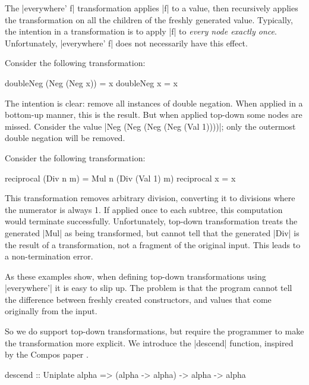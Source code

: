 The |everywhere' f| transformation applies |f| to a value, then recursively applies the transformation on all the children of the freshly generated value. Typically, the intention in a transformation is to apply |f| to \textit{every node exactly once}. Unfortunately, |everywhere' f| does not necessarily have this effect.

\begin{example}
Consider the following transformation:

\begin{code}
doubleNeg (Neg (Neg x))  = x
doubleNeg x              = x
\end{code}

The intention is clear: remove all instances of double negation. When applied in a bottom-up manner, this is the result. But when applied top-down some nodes are missed. Consider the value |Neg (Neg (Neg (Neg (Val 1))))|; only the outermost double negation will be removed.
\end{example}

\begin{example}
Consider the following transformation:

\begin{code}
reciprocal (Div n m)  = Mul n (Div (Val 1) m)
reciprocal x          = x
\end{code}

This transformation removes arbitrary division, converting it to divisions where the numerator is always 1. If applied once to each subtree, this computation would terminate successfully. Unfortunately, top-down transformation treats the generated |Mul| as  being transformed, but cannot tell that the generated |Div| is the result of a transformation, not a fragment of the original input. This leads to a non-termination error.
\end{example}

As these examples show, when defining top-down transformations using |everywhere'| it is easy to slip up. The problem is that the program cannot tell the difference between freshly created constructors, and values that come originally from the input.

So we do support top-down transformations, but require the programmer to make the transformation more explicit. We introduce the |descend| function, inspired by the Compos paper \cite{bringert:compos}.

\begin{code}
descend :: Uniplate alpha => (alpha -> alpha) -> alpha -> alpha
\end{code}


